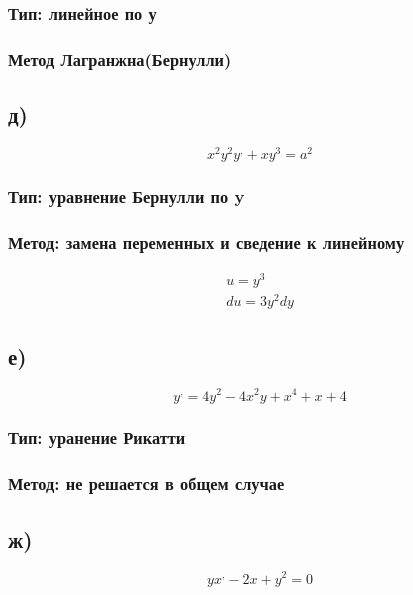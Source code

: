 \documentclass[a4paper]{article}
\begin{document}
\subsubsection*{Тип: линейное по у }

\subsubsection*{Метод Лагранжна(Бернулли)}

\subsection*{д)}
\begin{equation*}
x^2y^2y^, + xy^3 = a^2
\end{equation*}
\subsubsection*{Тип: уравнение Бернулли по y}

\subsubsection*{Метод: замена переменных и сведение к линейному}

\begin{gather*}
u=y^3\\
du=3y^2dy
\end{gather*}	

\subsection*{е)}
\begin{equation*}
y^, = 4y^2 - 4x^2y + x^4 + x + 4
\end{equation*}
\subsubsection*{Тип: уранение Рикатти}

\subsubsection*{Метод: не решается в общем случае}

\subsection*{ж)}
\begin{equation*}
y x^, - 2x + y^2 = 0
\end{equation*}
\end{document}
